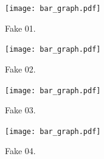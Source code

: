 
\begin{figure}[hbt]                                                 %
    \centering                                                      %
    \texttt{[image: bar\_graph.pdf]}           %
    \caption{Fake 01.}                                              %
    \label{fig:fake_01}                                             %
\end{figure}                                                        %

\begin{figure}[hbt]                                                 %
    \centering                                                      %
    \texttt{[image: bar\_graph.pdf]}           %
    \caption{Fake 02.}                                              %
    \label{fig:fake_02}                                             %
\end{figure}                                                        %

\begin{figure}[hbt]                                                 %
    \centering                                                      %
    \texttt{[image: bar\_graph.pdf]}           %
    \caption{Fake 03.}                                              %
    \label{fig:fake_03}                                             %
\end{figure}                                                        %

\begin{figure}[hbt]                                                 %
    \centering                                                      %
    \texttt{[image: bar\_graph.pdf]}           %
    \caption{Fake 04.}                                              %
    \label{fig:fake_04}                                             %
\end{figure}                                                        %

